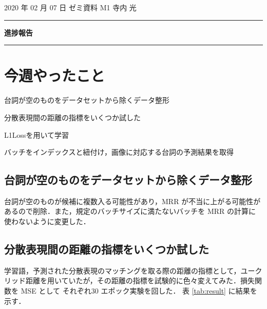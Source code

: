 \documentclass[onecolumn]{ujarticle}   %
\begin{document}
	\noindent

	\hspace{1em}
	2020 年 02 月 07 日
	ゼミ資料
	\hfill
	M1 寺内 光

	\vspace{2mm}

	\hrule

	\begin{center}
		{\Large \bf 進捗報告}
	\end{center}


	\hrule
	\vspace{3mm}

	\section{今週やったこと}
	\begin{itemize}{
		\item{台詞が空のものをデータセットから除くデータ整形}
		\item{分散表現間の距離の指標をいくつか試した}
		\item{L1Lossを用いて学習}
		\item{バッチをインデックスと紐付け，画像に対応する台詞の予測結果を取得}
	}
	\end{itemize}

	\subsection{台詞が空のものをデータセットから除くデータ整形}
	台詞が空のものが候補に複数入る可能性があり，MRR が不当に上がる可能性があるので削除．また，規定のバッチサイズに満たないバッチを MRR の計算に使わないように変更した．

	\subsection{分散表現間の距離の指標をいくつか試した}
	学習語，予測された分散表現のマッチングを取る際の距離の指標として，ユークリッド距離を用いていたが，その距離の指標を試験的に色々変えてみた．損失関数を MSE として それぞれ30 エポック実験を回した．
	表 \ref{tab:result} に結果を示す．
\end{document}
